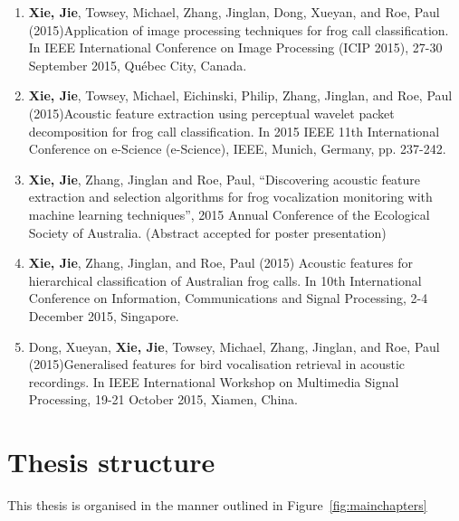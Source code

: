 \begin{enumerate}
\item	\textbf{Xie, Jie}, Towsey, Michael, Zhang, Jinglan, Dong, Xueyan, and Roe, Paul (2015)Application of image processing techniques for frog call classification. In IEEE International Conference on Image Processing (ICIP 2015), 27-30 September 2015, Québec City, Canada.

\item	\textbf{Xie, Jie}, Towsey, Michael, Eichinski, Philip, Zhang, Jinglan, and Roe, Paul (2015)Acoustic feature extraction using perceptual wavelet packet decomposition for frog call classification. In 2015 IEEE 11th International Conference on e-Science (e-Science), IEEE, Munich, Germany, pp. 237-242.

\item	\textbf{Xie, Jie}, Zhang, Jinglan and Roe, Paul,  “Discovering acoustic feature extraction and selection algorithms for frog vocalization monitoring with machine learning techniques”, 2015 Annual Conference of the Ecological Society of Australia. (Abstract accepted for poster presentation) 

\item	\textbf{Xie, Jie}, Zhang, Jinglan, and Roe, Paul (2015) Acoustic features for hierarchical classification of Australian frog calls. In 10th International Conference on Information, Communications and Signal Processing, 2-4 December 2015, Singapore.

\item	Dong, Xueyan, \textbf{Xie, Jie}, Towsey, Michael, Zhang, Jinglan, and Roe, Paul (2015)Generalised features for bird vocalisation retrieval in acoustic recordings. In IEEE International Workshop on Multimedia Signal Processing, 19-21 October 2015, Xiamen, China.

\end{enumerate} 




 
 
\section{Thesis structure} 
 
This thesis is organised in the manner outlined in Figure~\ref{fig:mainchapters}

